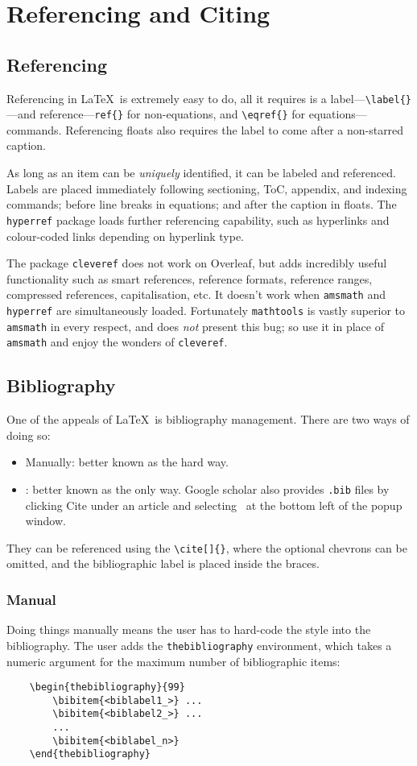 \chapter{Referencing and Citing}
\section{Referencing}
%
Referencing in \LaTeX~is extremely easy to do, all it requires is a label---\verb|\label{}|---and reference---\verb|ref{}| for non-equations, and \verb|\eqref{}| for equations---commands. Referencing floats also requires the label to come after a non-starred caption. 

As long as an item can be \emph{uniquely} identified, it can be labeled and referenced. Labels are placed immediately following sectioning, ToC, appendix, and indexing commands; before line breaks in equations; and after the caption in floats. The \verb|hyperref| package loads further referencing capability, such as hyperlinks and colour-coded links depending on hyperlink type.

The package \verb|cleveref| does not work on Overleaf, but adds incredibly useful functionality such as smart references, reference formats, reference ranges, compressed references, capitalisation, etc. It doesn't work when \verb|amsmath| and \verb|hyperref| are simultaneously loaded. Fortunately \verb|mathtools| is vastly superior to \verb|amsmath| in every respect, and does \emph{not} present this bug; so use it in place of \verb|amsmath| and enjoy the wonders of \verb|cleveref|.
%
\section{Bibliography}
%
One of the appeals of \LaTeX~is bibliography management. There are two ways of doing so:
\begin{itemize}
    \item Manually: better known as the hard way.
    \item \BibTeX: better known as the only way. Google scholar also provides \texttt{.bib} files by clicking Cite under an article and selecting \BibTeX~at the bottom left of the popup window.
\end{itemize}
They can be referenced using the \verb|\cite[]{}|, where the optional chevrons can be omitted, and the bibliographic label is placed inside the braces.
%
\subsection{Manual}
%
Doing things manually means the user has to hard-code the style into the bibliography. The user adds the \verb|thebibliography| environment, which takes a numeric argument for the maximum number of bibliographic items:
\begin{verbatim}
	\begin{thebibliography}{99}
	    \bibitem{<biblabel1_>} ...
	    \bibitem{<biblabel2_>} ...
	    ...
	    \bibitem{<biblabel_n>}
	\end{thebibliography}
\end{verbatim}
%
